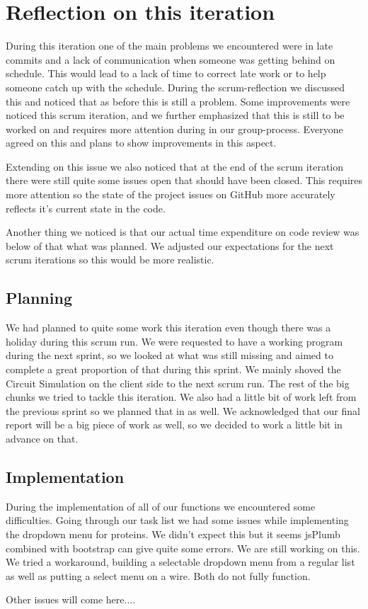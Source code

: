 \documentclass[a4paper]{article}
\begin{document}
\section{Reflection on this iteration}
During this iteration one of the main problems we encountered were in late commits and a lack of communication when someone was getting behind on schedule. This would lead to a lack of time to correct late work or to help someone catch up with the schedule. During the scrum-reflection we discussed this and noticed that as before this is still a problem. Some improvements were noticed this scrum iteration, and we further emphasized that this is still to be worked on and requires more attention during in our group-process. Everyone agreed on this and plans to show improvements in this aspect.

Extending on this issue we also noticed that at the end of the scrum iteration there were still quite some issues open that should have been closed. This requires more attention so the state of the project issues on GitHub more accurately reflects it's current state in the code.

Another thing we noticed is that our actual time expenditure on code review was below of that what was planned. We adjusted our expectations for the next scrum iterations so this would be more realistic.\\

\subsection{Planning}
We had planned to quite some work this iteration even though there was a holiday during this scrum run. We were requested to have a working program during the next sprint, so we looked at what was still missing and aimed to complete a great proportion of that during this sprint. We mainly shoved the Circuit Simulation on the client side to the next scrum run. The rest of the big chunks we tried to tackle this iteration. We also had a little bit of work left from the previous sprint so we planned that in as well. We acknowledged that our final report will be a big piece of work as well, so we decided to work a little bit in advance on that.
 
\subsection{Implementation}
During the implementation of all of our functions we encountered some difficulties. Going through our task list we had some issues while implementing the dropdown menu for proteins. We didn't expect this but it seems jsPlumb combined with bootstrap can give quite some errors. We are still working on this.
We tried a workaround, building a selectable dropdown menu from a regular list as well as putting a select menu on a wire. Both do not fully function.

Other issues will come here....
\end{document}
